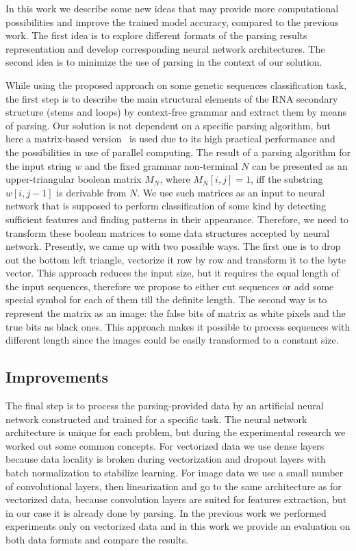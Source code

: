 \documentclass[12pt,a4paper]{cibb}
\begin{document}
In this work we describe some new ideas that may provide more computational possibilities and improve the trained model accuracy, compared to the previous work.
The first idea is to explore different formats of the parsing results representation and develop corresponding neural network architectures. The second idea is to minimize the use of parsing in the context of our solution.

While using the proposed approach on some genetic sequences classification task, the first step is to describe the main structural elements of the RNA secondary structure (stems and loops) by context-free grammar and extract them by means of parsing.
Our solution is not dependent on a specific parsing algorithm, but here a matrix-based version~\cite{Azimov:2018:CPQ:3210259.3210264} is used due to its high practical performance and the possibilities in use of parallel computing.
The result of a parsing algorithm for the input string $w$ and the fixed grammar non-terminal $N$ can be presented as an upper-triangular boolean matrix $M_N$, where $M_N [i,j] = 1$, iff the substring $w[i,j-1]$ is derivable from $N$.
We use such matrices as an input to neural network that is supposed to perform classification of some kind by detecting sufficient features and finding patterns in their appearance.
Therefore, we need to transform these boolean matrices to some data structures accepted by neural network.
Presently, we came up with two possible ways.
The first one is to drop out the bottom left triangle, vectorize it row by row and transform it to the byte vector.
This approach reduces the input size, but it requires the equal length of the input sequences, therefore we propose to either cut sequences or add some special symbol for each of them till the definite length.
The second way is to represent the matrix as an image: the false bits of matrix as white pixels and the true bits as black ones.
This approach makes it possible to process sequences with different length since the images could be easily transformed to a constant size.

\subsection{Improvements}

The final step is to process the parsing-provided data by an artificial neural network constructed and trained for a specific task.
The neural network architecture is unique for each problem, but during the experimental research we worked out some common concepts.
For vectorized data we use dense layers because data locality is broken during vectorization and dropout layers with batch normalization to stabilize learning.
For image data we use a small number of convolutional layers, then linearization and go to the same architecture as for vectorized data, because convolution layers are suited for features extraction, but in our case it is already done by parsing.
In the previous work we performed experiments only on vectorized data and in this work we provide an evaluation on both data formats and compare the results.
\end{document}
